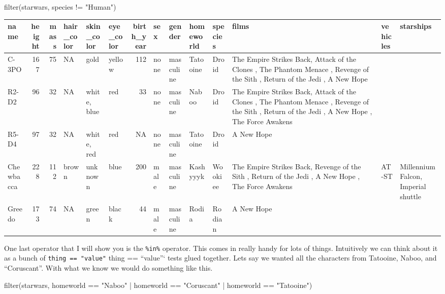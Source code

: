 \documentclass[
  letterpaper,
  DIV=11,
  numbers=noendperiod,
  oneside]{scrreprt}
\newenvironment{Shaded}{\begin{snugshade}}{\end{snugshade}}
\newcommand{\FunctionTok}[1]{\textcolor[rgb]{0.28,0.35,0.67}{#1}}
\newcommand{\NormalTok}[1]{\textcolor[rgb]{0.00,0.23,0.31}{#1}}
\newcommand{\SpecialCharTok}[1]{\textcolor[rgb]{0.37,0.37,0.37}{#1}}
\newcommand{\StringTok}[1]{\textcolor[rgb]{0.13,0.47,0.30}{#1}}
\begin{document}
\begin{Shaded}
\begin{Highlighting}[]
\FunctionTok{filter}\NormalTok{(starwars, species }\SpecialCharTok{!=} \StringTok{"Human"}\NormalTok{)}
\end{Highlighting}
\end{Shaded}

\begin{tabular}{l|r|r|l|l|l|r|l|l|l|l|l|l|l}
\hline
name & height & mass & hair\_color & skin\_color & eye\_color & birth\_year & sex & gender & homeworld & species & films & vehicles & starships\\
\hline
C-3PO & 167 & 75 & NA & gold & yellow & 112 & none & masculine & Tatooine & Droid & The Empire Strikes Back, Attack of the Clones   , The Phantom Menace     , Revenge of the Sith    , Return of the Jedi     , A New Hope &  & \\
\hline
R2-D2 & 96 & 32 & NA & white, blue & red & 33 & none & masculine & Naboo & Droid & The Empire Strikes Back, Attack of the Clones   , The Phantom Menace     , Revenge of the Sith    , Return of the Jedi     , A New Hope             , The Force Awakens &  & \\
\hline
R5-D4 & 97 & 32 & NA & white, red & red & NA & none & masculine & Tatooine & Droid & A New Hope &  & \\
\hline
Chewbacca & 228 & 112 & brown & unknown & blue & 200 & male & masculine & Kashyyyk & Wookiee & The Empire Strikes Back, Revenge of the Sith    , Return of the Jedi     , A New Hope             , The Force Awakens & AT-ST & Millennium Falcon, Imperial shuttle\\
\hline
Greedo & 173 & 74 & NA & green & black & 44 & male & masculine & Rodia & Rodian & A New Hope &  & \\
\hline
\end{tabular}

One last operator that I will show you is the \texttt{\%in\%} operator.
This comes in really handy for lots of things. Intuitively we can think
about it as a bunch of \texttt{thing\ ==\ "value"}\textbar{} thing ==
``value''` tests glued together. Lets say we wanted all the characters
from Tatooine, Naboo, and ``Coruscant''. With what we know we would do
something like this.

\begin{Shaded}
\begin{Highlighting}[]
\FunctionTok{filter}\NormalTok{(starwars, homeworld }\SpecialCharTok{==} \StringTok{"Naboo"} \SpecialCharTok{|}\NormalTok{ homeworld }\SpecialCharTok{==} \StringTok{"Coruscant"} \SpecialCharTok{|}\NormalTok{ homeworld }\SpecialCharTok{==} \StringTok{"Tatooine"}\NormalTok{)}
\end{Highlighting}
\end{Shaded}
\end{document}
